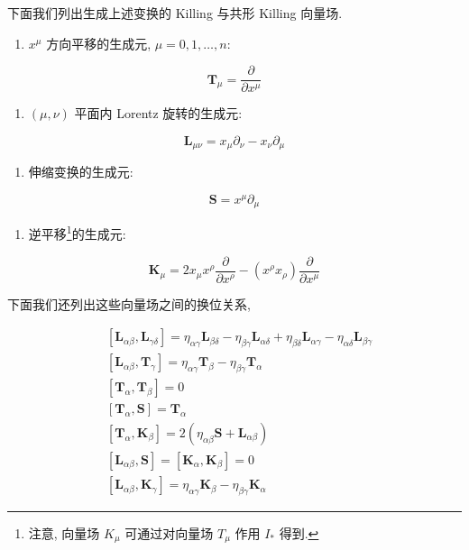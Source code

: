 下面我们列出生成上述变换的 Killing 与共形 Killing 向量场.

\begin{enumerate}
\renewcommand{\labelenumi}{\roman{enumi}.}
\item $x^{\mu}$ 方向平移的生成元, $\mu = 0, 1, \ldots, n$:
\end{enumerate}

\[
\mathbf{T}_{\mu} = \frac{\partial}{\partial x^{\mu}}
\]

\begin{enumerate}
\renewcommand{\labelenumi}{\roman{enumi}.}
\setcounter{enumi}{1}
\item $(\mu, \nu)$ 平面内 Lorentz 旋转的生成元:
\end{enumerate}

\[
\mathbf{L}_{\mu\nu} = x_{\mu}\partial_{\nu} - x_{\nu}\partial_{\mu}
\]

\begin{enumerate}
\renewcommand{\labelenumi}{\roman{enumi}.}
\setcounter{enumi}{2}
\item 伸缩变换的生成元:
\end{enumerate}

\[
\mathbf{S} = x^{\mu}\partial_{\mu}
\]

\begin{enumerate}
\renewcommand{\labelenumi}{\roman{enumi}.}
\setcounter{enumi}{3}
\item 逆平移\footnote{注意, 向量场 $K_{\mu}$ 可通过对向量场 $T_{\mu}$ 作用 $I_{*}$ 得到.}的生成元:
\end{enumerate}

\[
\mathbf{K}_{\mu} = 2x_{\mu}x^{\rho}\frac{\partial}{\partial x^{\rho}} - (x^{\rho}x_{\rho})\frac{\partial}{\partial x^{\mu}}
\]

下面我们还列出这些向量场之间的换位关系,

\begin{equation}
\begin{aligned}
&[\mathbf{L}_{\alpha\beta}, \mathbf{L}_{\gamma\delta}] = \eta_{\alpha\gamma}\mathbf{L}_{\beta\delta} - \eta_{\beta\gamma}\mathbf{L}_{\alpha\delta} + \eta_{\beta\delta}\mathbf{L}_{\alpha\gamma} - \eta_{\alpha\delta}\mathbf{L}_{\beta\gamma} \\
&[\mathbf{L}_{\alpha\beta}, \mathbf{T}_{\gamma}] = \eta_{\alpha\gamma}\mathbf{T}_{\beta} - \eta_{\beta\gamma}\mathbf{T}_{\alpha} \\
&[\mathbf{T}_{\alpha}, \mathbf{T}_{\beta}] = 0 \\
&[\mathbf{T}_{\alpha}, \mathbf{S}] = \mathbf{T}_{\alpha} \\
&[\mathbf{T}_{\alpha}, \mathbf{K}_{\beta}] = 2(\eta_{\alpha\beta}\mathbf{S} + \mathbf{L}_{\alpha\beta}) \\
&[\mathbf{L}_{\alpha\beta}, \mathbf{S}] = [\mathbf{K}_{\alpha}, \mathbf{K}_{\beta}] = 0 \\
&[\mathbf{L}_{\alpha\beta}, \mathbf{K}_{\gamma}] = \eta_{\alpha\gamma}\mathbf{K}_{\beta} - \eta_{\beta\gamma}\mathbf{K}_{\alpha}
\end{aligned}\label{eq:cA-431}
\end{equation}

